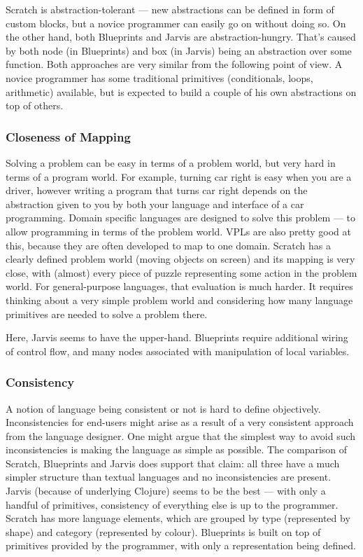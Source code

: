 \documentclass[11pt]{scrartcl}
\begin{document}
Scratch is abstraction-tolerant --- new abstractions can be defined in form of
custom blocks, but a novice programmer can easily go on without doing so.
On the other hand, both Blueprints and Jarvis are abstraction-hungry.
That’s caused by both node (in Blueprints) and box (in Jarvis) being an
abstraction over some function.
Both approaches are very similar from the following point of view.
A novice programmer has some traditional primitives (conditionals, loops,
arithmetic) available, but is expected to build a couple of his own abstractions
on top of others.

\subsubsection{Closeness of Mapping}
Solving a problem can be easy in terms of a problem world, but very hard in
terms of a program world.
For example, turning car right is easy when you are a driver, however writing a
program that turns car right depends on the abstraction given to you by both
your language and interface of a car programming.
Domain specific languages are designed to solve this problem --- to allow
programming in terms of the problem world.
VPLs are also pretty good at this, because they are often developed to map to
one domain.
Scratch has a clearly defined problem world (moving objects on screen) and its
mapping is very close, with (almost) every piece of puzzle representing some
action in the problem world.
For general-purpose languages, that evaluation is much harder.
It requires thinking about a very simple problem world and considering how many
language primitives are needed to solve a problem there.

Here, Jarvis seems to have the upper-hand.
Blueprints require additional wiring of control flow, and many nodes associated
with manipulation of local variables.

\subsubsection{Consistency}
A notion of language being consistent or not is hard to define objectively.
Inconsistencies for end-users might arise as a result of a very consistent
approach from the language designer.
One might argue that the simplest way to avoid such inconsistencies is making
the language as simple as possible.
The comparison of Scratch, Blueprints and Jarvis does support that claim: all
three have a much simpler structure than textual languages and no
inconsistencies are present.
Jarvis (because of underlying Clojure) seems to be the best --- with only a
handful of primitives, consistency of everything else is up to the programmer.
Scratch has more language elements, which are grouped by type (represented by
shape) and category (represented by colour).
Blueprints is built on top of primitives provided by the programmer, with only a
representation being defined.
\end{document}
